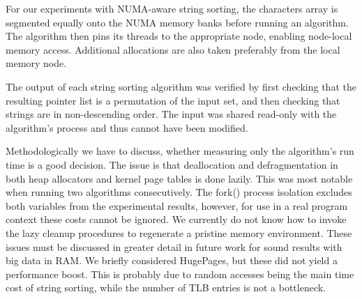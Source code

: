 \documentclass[a4paper]{myjournal}
\begin{document}
For our experiments with NUMA-aware string sorting, the characters array is
segmented equally onto the NUMA memory banks before running an algorithm.  The
algorithm then pins its threads to the appropriate node, enabling node-local
memory access. Additional allocations are also taken preferably from the local
memory node.

The output of each string sorting algorithm was verified by first checking that
the resulting pointer list is a permutation of the input set, and then checking
that strings are in non-descending order. The input was shared read-only with
the algorithm's process and thus cannot have been modified.

Methodologically we have to discuss, whether measuring only the algorithm's run
time is a good decision. The issue is that deallocation and defragmentation in
both heap allocators and kernel page tables is done lazily. This was most
notable when running two algorithms consecutively. The fork() process isolation
excludes both variables from the experimental results, however, for use in a
real program context these costs cannot be ignored. We currently do not know
how to invoke the lazy cleanup procedures to regenerate a pristine memory
environment. These issues must be discussed in greater detail in future work for
sound results with big data in RAM.  We briefly considered HugePages, but these
did not yield a performance boost. This is probably due to random accesses being
the main time cost of string sorting, while the number of TLB entries is not a
bottleneck.
\end{document}

